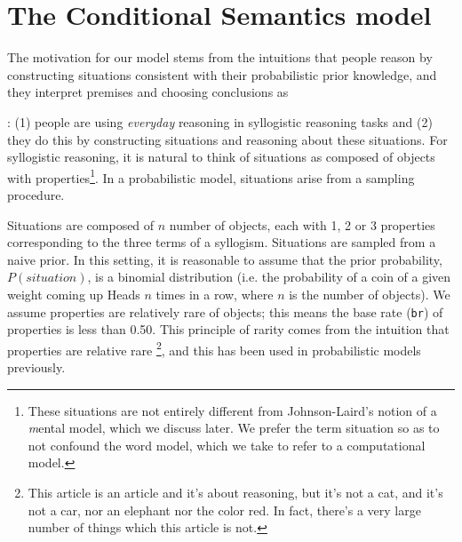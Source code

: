\documentclass[10pt,letterpaper]{article}
\begin{document}
%
%

\section{The Conditional Semantics model}

The motivation for our model stems from the intuitions that people reason by constructing situations consistent with their probabilistic prior knowledge, and they interpret premises and choosing conclusions as 


: (1) people are using \emph{everyday} reasoning in syllogistic reasoning tasks and (2) they do this by constructing situations and reasoning about these situations. For syllogistic reasoning, it is natural to think of situations as composed of objects with properties\footnote{These situations are not entirely different from Johnson-Laird's notion of a {\emph mental model}, which we discuss later. We prefer the term situation so as to not confound the word model, which we take to refer to a computational model.}. In a probabilistic model, situations arise from a sampling procedure.

Situations are composed of $n$ number of objects, each with 1, 2 or 3 properties corresponding to the three terms of a syllogism. Situations are sampled from a naive prior. In this setting, it is reasonable to assume that the prior probability, $P(situation)$, is a binomial distribution (i.e. the probability of a coin of a given weight coming up Heads $n$ times in a row, where $n$ is the number of objects). We assume properties are relatively rare of objects; this means the base rate (\lstinline{br}) of properties is less than 0.50.  This principle of rarity comes from the intuition that properties are relative rare \footnote{This article is an article and it's about reasoning, but it's not a cat, and it's not a car, nor an elephant nor the color red. In fact, there's a very large number of things which this article is not.}, and this has been used in probabilistic models previously. 
\end{document}
